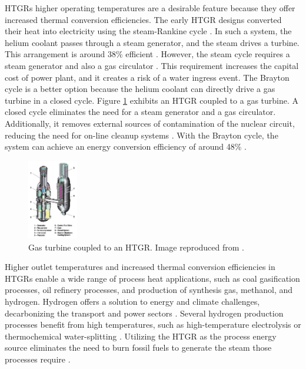 HTGRs higher operating temperatures are a desirable feature because they offer increased thermal conversion efficiencies.
The early \gls{HTGR} designs converted their heat into electricity using the steam-Rankine cycle \cite{herranz_power_2009}.
In such a system, the helium coolant passes through a steam generator, and the steam drives a turbine.
This arrangement is around 38\% efficient \cite{breeze_nuclear_2014}.
However, the steam cycle requires a steam generator and also a gas circulator \cite{no_review_2007}.
This requirement increases the capital cost of power plant, and it creates a risk of a water ingress event.
The Brayton cycle is a better option because the helium coolant can directly drive a gas turbine in a closed cycle.
Figure \ref{fig:gt-mhr} exhibits an HTGR coupled to a gas turbine.
A closed cycle eliminates the need for a steam generator and a gas circulator.
Additionally, it removes external sources of contamination of the nuclear circuit, reducing the need for on-line cleanup systems \cite{iaea_current_2001}.
With the Brayton cycle, the system can achieve an energy conversion efficiency of around 48\% \cite{breeze_nuclear_2014}.

\begin{figure}[htbp!]
	\centering
	\includegraphics[height=3.5cm]{figures/gt-mhr3}
	\caption{Gas turbine coupled to an HTGR. Image reproduced from \cite{baxi_evaluation_2008}.}
	\label{fig:gt-mhr}
\end{figure}

Higher outlet temperatures and increased thermal conversion efficiencies in HTGRs enable a wide range of process heat applications, such as coal gasification processes, oil refinery processes, and production of synthesis gas, methanol, and hydrogen.
Hydrogen offers a solution to energy and climate challenges, decarbonizing the transport and power sectors \cite{nagashima_japans_2018}.
Several hydrogen production processes benefit from high temperatures, such as high-temperature electrolysis \cite{doenitz_hydrogen_1980} or thermochemical water-splitting \cite{yildiz_efficiency_2006}.
Utilizing the \gls{HTGR} as the process energy source eliminates the need to burn fossil fuels to generate the steam those processes require \cite{iaea_current_2001}.

